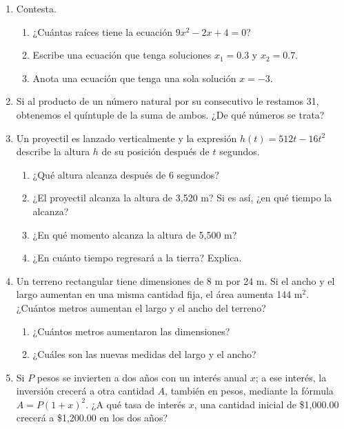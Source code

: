 \documentclass[11pt]{book}
\begin{document}
\begin{enumerate}
  \item Contesta.
        \begin{enumerate}
          \item ¿Cuántas raíces tiene la ecuación $9x^2 - 2x + 4 = 0$?
          \item Escribe una ecuación que tenga soluciones $x_1 = 0.3$ y $x_2 = 0.7$.
          \item Anota una ecuación que tenga una sola solución $x = -3$.
        \end{enumerate}

  \item Si al producto de un número natural por su consecutivo le restamos 31, obtenemos
        el quíntuple de la suma de ambos. ¿De qué números se trata?

  \item Un proyectil es lanzado verticalmente y la expresión $h(t) = 512t - 16t^2$ describe la
        altura $h$ de su posición después de $t$ segundos.
        \begin{enumerate}
          \item ¿Qué altura alcanza después de 6 segundos?
          \item ¿El proyectil alcanza la altura de 3,520 m? Si es así, ¿en qué tiempo la alcanza?
          \item ¿En qué momento alcanza la altura de 5,500 m?
          \item ¿En cuánto tiempo regresará a la tierra? Explica.

        \end{enumerate}

  \item Un terreno rectangular tiene dimensiones de 8 m por 24 m. Si el ancho y el largo
        aumentan en una misma cantidad fija, el área aumenta 144 m$^2$. ¿Cuántos metros
        aumentan el largo y el ancho del terreno?
        \begin{enumerate}
          \item ¿Cuántos metros aumentaron las dimensiones?
          \item ¿Cuáles son las nuevas medidas del largo y el ancho?
        \end{enumerate}

  \item Si $P$ pesos se invierten a dos años con un interés anual $x$; a ese interés, la inversión
        crecerá a otra cantidad $A$, también en pesos, mediante la fórmula $A = P(1 + x)^2$.
        ¿A qué tasa de interés $x$, una cantidad inicial de \$1,000.00 crecerá a \$1,200.00 en los dos años?


\end{enumerate}
\end{document}
